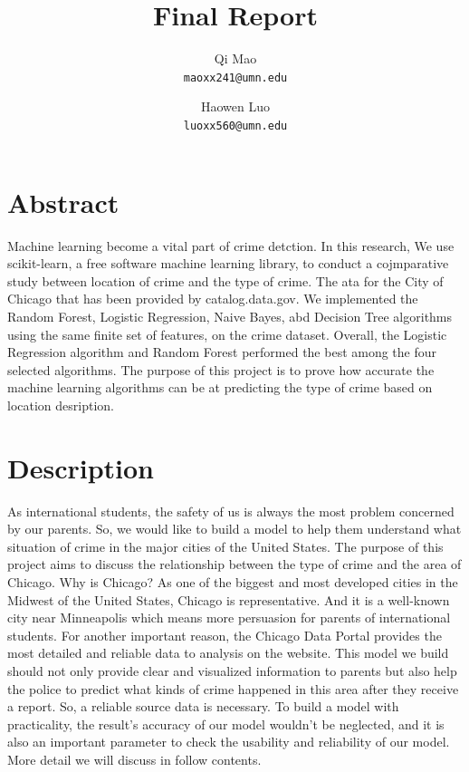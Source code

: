\documentclass{article}
\begin{document}
\title{Final Report}
\author{Qi Mao\\
  \texttt{maoxx241@umn.edu}
  \and
  Haowen Luo\\
  \texttt{luoxx560@umn.edu}
  }
\maketitle

\section{Abstract}
Machine learning become a vital part of crime detction. In this research, We use scikit-learn, a free software machine learning library, to conduct a cojmparative study between location of crime and the type of crime. The ata for the City of Chicago that has been provided by catalog.data.gov. We implemented the Random Forest, Logistic Regression, Naive Bayes, abd Decision Tree algorithms using the same finite set of features, on the crime dataset. Overall, the Logistic Regression algorithm and Random Forest performed the best among the four selected algorithms. The purpose of this project is to prove how accurate the machine learning algorithms can be at predicting the type of crime based on location desription.

\section{Description}
As international students, the safety of us is always the most problem concerned by our parents. So, we would like to build a model to help them understand what situation of crime in the major cities of the United States. The purpose of this project aims to discuss the relationship between the type of crime and the area of Chicago. Why is Chicago? As one of the biggest and most developed cities in the Midwest of the United States, Chicago is representative. And it is a well-known city near Minneapolis which means more persuasion for parents of international students. For another important reason, the Chicago Data Portal provides the most detailed and reliable data to analysis on the website. This model we build should not only provide clear and visualized information to parents but also help the police to predict what kinds of crime happened in this area after they receive a report. So, a reliable source data is necessary. To build a model with practicality, the result’s accuracy of our model wouldn’t be neglected, and it is also an important parameter to check the usability and reliability of our model. More detail we will discuss in follow contents.
\end{document}
